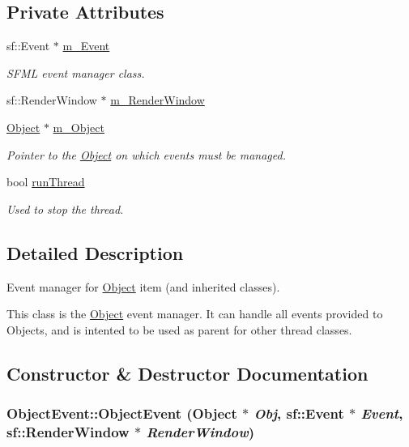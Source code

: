 \subsection*{Private Attributes}
\begin{CompactItemize}
\item 
sf::Event $\ast$ \hyperlink{classObjectEvent_c03cec5b97d4a2038c6f75d7b679e997}{m\_\-Event}
\begin{CompactList}\small\item\em SFML event manager class. \item\end{CompactList}\item 
sf::RenderWindow $\ast$ \hyperlink{classObjectEvent_9a1b0ae1d8f82924abfa682e59f40eb8}{m\_\-RenderWindow}
\item 
\hyperlink{classObject}{Object} $\ast$ \hyperlink{classObjectEvent_4ef3c90c68494a5af8b740694a2a8f48}{m\_\-Object}
\begin{CompactList}\small\item\em Pointer to the \hyperlink{classObject}{Object} on which events must be managed. \item\end{CompactList}\item 
bool \hyperlink{classObjectEvent_507af79e039621e6c2dab1af54c8653b}{runThread}
\begin{CompactList}\small\item\em Used to stop the thread. \item\end{CompactList}\end{CompactItemize}


\subsection{Detailed Description}
Event manager for \hyperlink{classObject}{Object} item (and inherited classes). 

This class is the \hyperlink{classObject}{Object} event manager. It can handle all events provided to Objects, and is intented to be used as parent for other thread classes. 

\subsection{Constructor \& Destructor Documentation}
\hypertarget{classObjectEvent_1ca186fc94027fe25f106e8741a152c5}{
\subsubsection[ObjectEvent]{\setlength{\rightskip}{0pt plus 5cm}ObjectEvent::ObjectEvent ({\bf Object} $\ast$ {\em Obj}, \/  sf::Event $\ast$ {\em Event}, \/  sf::RenderWindow $\ast$ {\em RenderWindow})}}
\label{classObjectEvent_1ca186fc94027fe25f106e8741a152c5}





